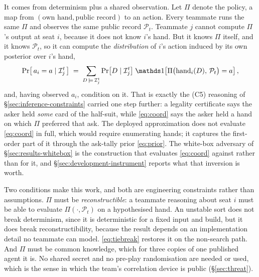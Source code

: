 It comes from determinism plus a shared observation. Let $\Pi$ denote the policy, a map from
$(\text{own hand}, \text{public record})$ to an action. Every teammate runs the same $\Pi$ and
observes the same public record $\mathcal{P}_t$. Teammate $j$ cannot compute $\Pi$'s output at seat
$i$, because it does not know $i$'s hand. But it knows $\Pi$ itself, and it knows $\mathcal{P}_t$, so
it can compute the \emph{distribution} of $i$'s action induced by its own posterior over $i$'s hand,
\begin{equation}
  \Pr\bigl[\,a_i = a \mid \mathcal{I}_j^t\,\bigr]
  \;=\; \sum_{D \,\models\, \mathcal{I}_j^t}
  \Pr\bigl[D \mid \mathcal{I}_j^t\bigr]\;
  \ind\!\left[\Pi\bigl(\text{hand}_i(D),\, \mathcal{P}_t\bigr) = a\right],
  \label{eq:coord}
\end{equation}
and, having observed $a_i$, condition on it. That is exactly the (C5) reasoning of
\S\ref{sec:inference-constraints} carried one step further: a legality certificate says the asker
held \emph{some} card of the half-suit, while \eqref{eq:coord} says the asker held a hand on which
$\Pi$ preferred that ask. The deployed approximation does not evaluate \eqref{eq:coord} in full,
which would require enumerating hands; it captures the first-order part of it through the ask-tally
prior \eqref{eq:prior}. The white-box adversary of \S\ref{sec:results-whitebox} is the construction
that evaluates \eqref{eq:coord} against \sestina{} rather than for it, and
\S\ref{sec:development-instrument} reports what that inversion is worth.

Two conditions make this work, and both are engineering constraints rather than assumptions. $\Pi$
must be \emph{reconstructible}: a teammate reasoning about seat $i$ must be able to evaluate
$\Pi(\cdot,\mathcal{P}_t)$ on a hypothesised hand. An unstable sort does not break determinism, since
it is deterministic for a fixed input and build, but it does break reconstructibility, because the
result depends on an implementation detail no teammate can model. \eqref{eq:tiebreak} restores it on
the non-search path. And $\Pi$ must be common
knowledge, which for three copies of one published agent it is. No shared secret and no pre-play
randomisation are needed or used, which is the sense in which the team's correlation device is public
(\S\ref{sec:threat}).

